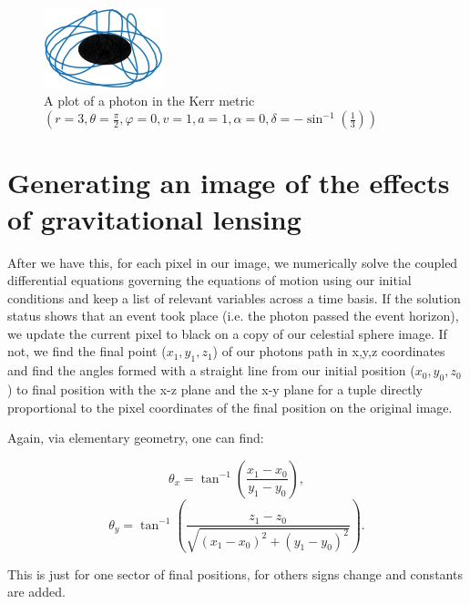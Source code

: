 \documentclass[oneside,openright,frontopenright, singlespacing]{dmathesis}
\begin{document}
\begin{figure}[!ht]
	\centering
	\includegraphics[width=0.7\linewidth]{img/kerr-path}
	\caption{A plot of a photon in the Kerr metric $\left(r=3, \theta=\frac{\pi}{2}, \varphi=0, v=1, a=1, \alpha=0, \delta=-\sin^{-1}(\frac{1}{3})\right)$}
	\label{fig:Figure4.2}
\end{figure}

\section{Generating an image of the effects of gravitational lensing}\label{sec:Section5.7}

	After we have this, for each pixel in our image, we numerically solve the coupled differential equations governing the equations of motion using our initial conditions and keep a list of relevant variables across a time basis. If the solution status shows that an event took place  (i.e. the photon passed the event horizon), we update the current pixel to black on a copy of our celestial sphere image. If not, we find the final point ($x_1,y_1,z_1$) of our photons path in x,y,z coordinates and find the angles formed with a straight line from our initial position ($x_0,y_0,z_0$) to final position with the x-z plane and the x-y plane for a tuple directly proportional to the pixel coordinates of the final position on the original image.

\vspace{1em}
	Again, via elementary geometry, one can find:

	\[\theta_{x} = \tan^{-1}\left(\frac{x_1-x_0}{y_1-y_0}\right),\]
	\[\theta_{y} = \tan^{-1}\left(\frac{z_1-z_0}{\sqrt{(x_1-x_0)^2+(y_1-y_0)^2}}\right).\]

\vspace{1em}
	This is just for one sector of final positions, for others signs change and constants are added.
\end{document}
